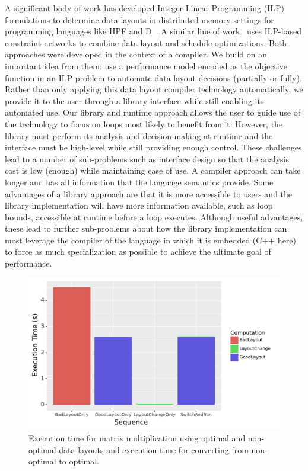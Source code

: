 \documentclass{article}
\begin{document}
A significant body of work has developed Integer Linear Programming (ILP) formulations to determine data layouts in distributed memory settings for programming languages like HPF and D~\cite{bixby1994automatic,kennedy1995automatic,kennedy1998automatic}. 
A similar line of work~\cite{chen2004ilp,chen2005constraint,chen2005integrating, ozturk2011data} uses ILP-based constraint networks to combine data layout and schedule optimizations. 
Both approaches were developed in the context of a compiler. 
We build on an important idea from them: use a performance model encoded as the objective function in an ILP problem to automate data layout decisions (partially or fully).
Rather than only applying this data layout compiler technology automatically, we provide it to the user through a library interface while still enabling its automated use.
Our library and runtime approach allows the user to guide use of the technology to focus on loops most likely to benefit from it.
However, the library must perform its analysis and decision making at runtime and the interface must be high-level while still providing enough control. 
These challenges lead to a number of sub-problems such as interface design so that the analysis cost is low (enough) while maintaining ease of use.
A compiler approach can take longer and has all information that the language semantics provide.
Some advantages of a library approach are that it is more accessible to users and the library implementation will have more information available, such as loop bounds, accessible at runtime before a loop executes.
Although useful advantages, these lead to further sub-problems about how the library implementation can most leverage the compiler of the language in which it is embedded (C++ here) to force as much specialization as possible to achieve the ultimate goal of performance.
\begin{figure}
	\includegraphics[width=\columnwidth]{IntroExampleGraph.pdf}
	\caption{Execution time for matrix multiplication using optimal and non-optimal data layouts and execution time for converting from non-optimal to optimal.}
	\label{DataLayoutImportance}
\end{figure}
\end{document}
